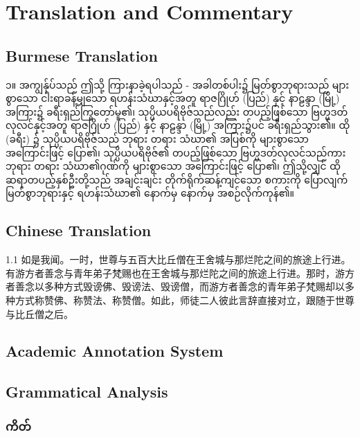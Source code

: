 \chapter{Translation and Commentary}
\starthere

\section{Burmese Translation}
၁။ အကျွန်ုပ်သည် ဤသို့ ကြားနာခဲ့ရပါသည် - အခါတစ်ပါး၌ မြတ်စွာဘုရားသည် များစွာသော ငါးရာခန့်မျှသော ရဟန်းသံဃာနှင့်အတူ ရာဇဂြိုဟ် (ပြည်) နှင့် နာဠန္ဒာ (မြို့) အကြား၌ ခရီးရှည်ကြွတော်မူ၏၊ သုပ္ပိယပရိဗိုဇ်သည်လည်း တပည့်ဖြစ်သော ဗြဟ္မဒတ်လုလင်နှင့်အတူ ရာဇဂြိုဟ် (ပြည်) နှင့် နာဠန္ဒာ (မြို့) အကြား၌ပင် ခရီးရှည်သွား၏။ ထို (ခရီး) ၌ သုပ္ပိယပရိဗိုဇ်သည် ဘုရား တရား သံဃာ၏ အပြစ်ကို များစွာသော အကြောင်းဖြင့် ပြော၏၊ သုပ္ပိယပရိဗိုဇ်၏ တပည့်ဖြစ်သော ဗြဟ္မဒတ်လုလင်သည်ကား ဘုရား တရား သံဃာ၏ဂုဏ်ကို များစွာသော အကြောင်းဖြင့် ပြော၏၊ ဤသို့လျှင် ထိုဆရာတပည့်နှစ်ဦးတို့သည် အချင်းချင်း တိုက်ရိုက်ဆန့်ကျင်သော စကားကို ပြောလျက် မြတ်စွာဘုရားနှင့် ရဟန်းသံဃာ၏ နောက်မှ နောက်မှ အစဉ်လိုက်ကုန်၏။

\section{Chinese Translation}
1.1 如是我闻。一时，世尊与五百大比丘僧在王舍城与那烂陀之间的旅途上行进。有游方者善念与青年弟子梵赐也在王舍城与那烂陀之间的旅途上行进。那时，游方者善念以多种方式毁谤佛、毁谤法、毁谤僧，而游方者善念的青年弟子梵赐却以多种方式称赞佛、称赞法、称赞僧。如此，师徒二人彼此言辞直接对立，跟随于世尊与比丘僧之后。

\section{Academic Annotation System}




\section{Grammatical Analysis}
\subsection{ကိတ်}
\kitabasic{}{}{}


